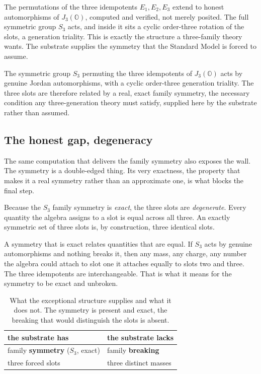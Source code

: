 The permutations of the three idempotents $E_1, E_2, E_3$ extend to honest automorphisms of $J_3(\mathbb{O})$, computed and verified, not merely posited. The full symmetric group $S_3$ acts, and inside it sits a cyclic order-three rotation of the slots, a generation triality. This is exactly the structure a three-family theory wants. The substrate supplies the symmetry that the Standard Model is forced to assume.

\begin{proposition}
The symmetric group $S_3$ permuting the three idempotents of $J_3(\mathbb{O})$ acts by genuine Jordan automorphisms, with a cyclic order-three generation triality. The three slots are therefore related by a real, exact family symmetry, the necessary condition any three-generation theory must satisfy, supplied here by the substrate rather than assumed.
\end{proposition}

\subsection{The honest gap, degeneracy}

The same computation that delivers the family symmetry also exposes the wall. The symmetry is a double-edged thing. Its very exactness, the property that makes it a real symmetry rather than an approximate one, is what blocks the final step.

\begin{principle}
Because the $S_3$ family symmetry is \emph{exact}, the three slots are \emph{degenerate}. Every quantity the algebra assigns to a slot is equal across all three. An exactly symmetric set of three slots is, by construction, three identical slots.
\end{principle}

A symmetry that is exact relates quantities that are equal. If $S_3$ acts by genuine automorphisms and nothing breaks it, then any mass, any charge, any number the algebra could attach to slot one it attaches equally to slots two and three. The three idempotents are interchangeable. That is what it means for the symmetry to be exact and unbroken.

\begin{table}[ht]
\centering
\begin{tabular}{@{}ll@{}}
\toprule
the substrate has & the substrate lacks \\
\midrule
family \textbf{symmetry} ($S_3$, exact) & family \textbf{breaking} \\
three forced slots & three distinct masses \\
\bottomrule
\end{tabular}
\caption{What the exceptional structure supplies and what it does not. The symmetry is present and exact, the breaking that would distinguish the slots is absent.}
\label{tab:have-lack}
\end{table}

